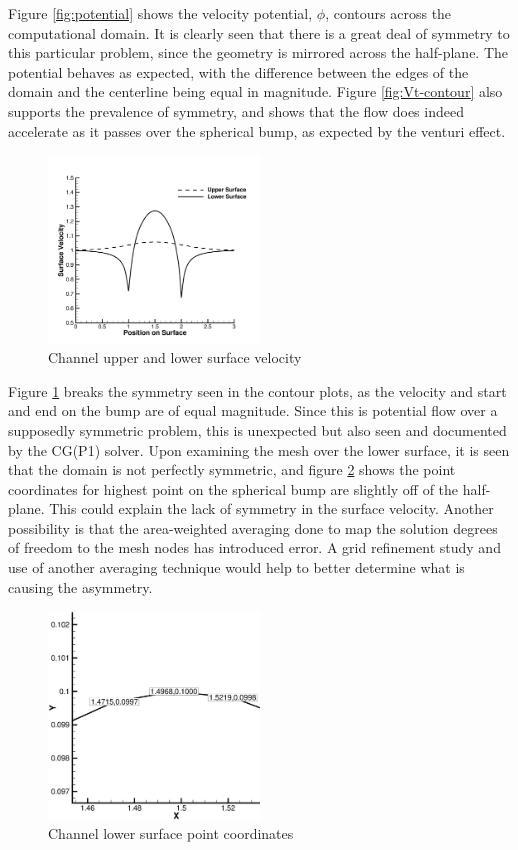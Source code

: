 \documentclass[a4paper]{article}
\begin{document}
Figure \ref{fig:potential} shows the velocity potential, $\phi$, contours across
the computational domain.  It is clearly seen that there is a great deal of
symmetry to this particular problem, since the geometry is mirrored across the
half-plane.  The potential behaves as expected, with the difference between the
edges of the domain and the centerline being equal in magnitude.  Figure
\ref{fig:Vt-contour} also supports the prevalence of symmetry, and shows that
the flow does indeed accelerate as it passes over the spherical bump, as
expected by the venturi effect.    
\begin{figure}[h]
  \centering
  \includegraphics[width=0.5\textwidth]{figures/surface_velocity}
  \caption{Channel upper and lower surface velocity}
  \label{fig:surface-velocity}
\end{figure}
Figure \ref{fig:surface-velocity} breaks the
symmetry seen in the contour plots, as the velocity and start and end on the
bump are of equal magnitude.  Since this is potential flow over a supposedly
symmetric problem, this is unexpected but also seen and documented by the
CG(P1) solver. Upon examining the mesh over the lower surface, it is seen that
the domain is not perfectly symmetric, and figure \ref{fig:lower-surface} shows
the point coordinates for highest point on the spherical bump are slightly off
of the half-plane. This could explain the lack of symmetry in the surface
velocity.  Another possibility is that the area-weighted averaging done to map
the solution degrees of freedom to the mesh nodes has introduced error.  A grid
refinement study and use of another averaging technique would help to better
determine what is causing the asymmetry.
\begin{figure}[h]
  \centering
  \includegraphics[width=0.5\textwidth]{figures/lower_surface}
  \caption{Channel lower surface point coordinates}
  \label{fig:lower-surface}
\end{figure}
\end{document}
